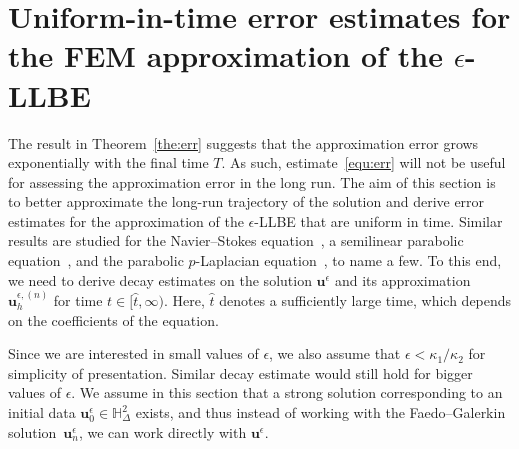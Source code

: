 \documentclass[11pt,reqno]{amsart}
\theoremstyle{definition}
\numberwithin{equation}{section}
\newcommand{\bff}{\boldsymbol}
\newcommand{\bb}{\mathbb}
\begin{document}
\section{Uniform-in-time error estimates for the FEM approximation of the $\epsilon$-LLBE}
\label{sec:longtime}

The result in Theorem~\ref{the:err} suggests that the
approximation error grows exponentially with the {final time $T$}. As such,
estimate~\eqref{equ:err} will not be useful for assessing the approximation
error in the long run.
The aim of this section is to better approximate the long-run trajectory of the
solution and derive error estimates for the approximation of the $\epsilon$-LLBE
that are uniform in time. Similar results are studied for the Navier--Stokes
equation~\citep{HeyRan86}, a semilinear parabolic equation~\citep{Lar89}, and the
parabolic $p$-Laplacian equation~\citep{Ju00}, to name a few. To this end, we
need to derive decay estimates on the solution $\bff{u}^\epsilon$ and its approximation $\bff{u}_h^{\epsilon, (n)}$ for time $t\in [\hat{t},\infty)$. Here,
$\hat{t}$ denotes a sufficiently large time, which depends on the coefficients
of the equation.

Since we are interested in small values of $\epsilon$, we also assume that
$\epsilon<\kappa_1/\kappa_2$ for simplicity of presentation. Similar decay
estimate would still hold for bigger values of $\epsilon$. We assume in this section that a strong solution corresponding to an initial data $\bff{u}_0^\epsilon \in \bb{H}^2_\Delta$ exists, and thus instead of working with the
Faedo--Galerkin solution~$\bff{u}_n^\epsilon$, we can work directly with
$\bff{u}^\epsilon$.
\end{document}

